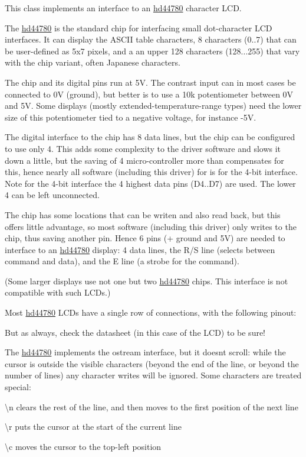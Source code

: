 This class implements an interface to an \hyperlink{classhwlib_1_1hd44780}{hd44780} character L\+CD.



The \hyperlink{classhwlib_1_1hd44780}{hd44780} is the standard chip for interfacing small dot-\/character L\+CD interfaces. It can display the A\+S\+C\+II table characters, 8 characters (0..7) that can be user-\/defined as 5x7 pixels, and a an upper 128 characters (128...255) that vary with the chip variant, often Japanese characters.

The chip and its digital pins run at 5V. The contrast input can in most cases be connected to 0V (ground), but better is to use a 10k potentiometer between 0V and 5V. Some displays (mostly extended-\/temperature-\/range types) need the lower size of this potentiometer tied to a negative voltage, for instance -\/5V.

The digital interface to the chip has 8 data lines, but the chip can be configured to use only 4. This adds some complexity to the driver software and slows it down a little, but the saving of 4 micro-\/controller more than compensates for this, hence nearly all software (including this driver) for is for the 4-\/bit interface. Note for the 4-\/bit interface the 4 highest data pins (D4..D7) are used. The lower 4 can be left unconnected.

The chip has some locations that can be writen and also read back, but this offers little advantage, so most software (including this driver) only writes to the chip, thus saving another pin. Hence 6 pins (+ ground and 5V) are needed to interface to an \hyperlink{classhwlib_1_1hd44780}{hd44780} display\+: 4 data lines, the R/S line (selects between command and data), and the E line (a strobe for the command).



(Some larger displays use not one but two \hyperlink{classhwlib_1_1hd44780}{hd44780} chips. This interface is not compatible with such L\+C\+Ds.)

Most \hyperlink{classhwlib_1_1hd44780}{hd44780} L\+C\+Ds have a single row of connections, with the following pinout\+:



But as always, check the datasheet (in this case of the L\+CD) to be sure!

The \hyperlink{classhwlib_1_1hd44780}{hd44780} implements the ostream interface, but it doesn\textquotesingle{}t scroll\+: while the cursor is outside the visible characters (beyond the end of the line, or beyond the number of lines) any character writes will be ignored. Some characters are treated special\+:
\begin{DoxyItemize}
\item \textquotesingle{}\textbackslash{}n\textquotesingle{} clears the rest of the line, and then moves to the first position of the next line
\item \textquotesingle{}\textbackslash{}r\textquotesingle{} puts the cursor at the start of the current line
\item \textquotesingle{}\textbackslash{}c\textquotesingle{} moves the cursor to the top-\/left position
\end{DoxyItemize}

